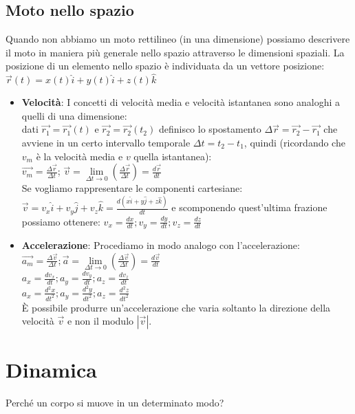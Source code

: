 \documentclass[a4paper,12pt]{report}
\begin{document}
	\section{Moto nello spazio}
	Quando non abbiamo un moto rettilineo (in una dimensione) possiamo descrivere il moto in maniera più generale nello spazio attraverso le dimensioni spaziali. La posizione di un elemento nello spazio è individuata da un vettore posizione:\\
	$\vec{r}(t) = x(t)\hat{i} + y(t)\hat{i} + z(t)\hat{k}$\\
	\begin{itemize}
		\item \textbf{Velocità}: I concetti di velocità media e velocità istantanea sono analoghi a quelli di una dimensione:\\
		dati $\vec{r_1} = \vec{r_1}(t)$ e $\vec{r_2} = \vec{r_2}(t_2)$ definisco lo spostamento $\Delta\vec{r} = \vec{r_2} - \vec{r_1}$ che avviene in un certo intervallo temporale $\Delta t = t_2 - t_1$, quindi (ricordando che $v_m$ è la velocità media e $v$ quella istantanea):\\
		$\vec{v_m} = \frac{\Delta \vec{r}}{\Delta t}$;\;\;\;\;
		$\vec{v} = \lim\limits_{\Delta t \to 0}(\frac{\Delta\vec{r}}{\Delta t}) = \frac{d\vec{r}}{dt}$\\
		Se vogliamo rappresentare le componenti cartesiane:\\$\vec{v} = v_x\hat{i} + v_y\hat{j} + v_z\hat{k} = \frac{d(x\hat{i} + y\hat{j} + z\hat{k})}{dt}$ e scomponendo quest'ultima frazione possiamo ottenere: $v_x = \frac{dx}{dt};$\;\;\;$v_y = \frac{dy}{dt};$\;\;\;$v_z = \frac{dz}{dt}$
		\item \textbf{Accelerazione}: Procediamo in modo analogo con l'accelerazione:\\
		$\vec{a_m} = \frac{\Delta\vec{v}}{\Delta t};$\;\;\;\;$\vec{a} = \lim\limits_{\Delta t\to0}(\frac{\Delta\vec{v}}{\Delta t}) = \frac{d\vec{v}}{dt}$\\
		$a_x = \frac{dv_x}{dt};$\;\;\;\;$a_y = \frac{dv_y}{dt};$\;\;\;\;$a_z = \frac{dv_z}{dt}$\\
		$a_x = \frac{d^2x}{dt^2};$\;\;\;\;$a_y = \frac{d^2y}{dt^2};$\;\;\;\;$a_z = \frac{d^2z}{dt^2}$\\
		È possibile produrre un'accelerazione che varia soltanto la direzione della velocità $\vec{v}$ e non il modulo $|\vec{v}|$.
	\end{itemize}
	\chapter{Dinamica}
	Perché un corpo si muove in un determinato modo?
	\appendix
\end{document}
